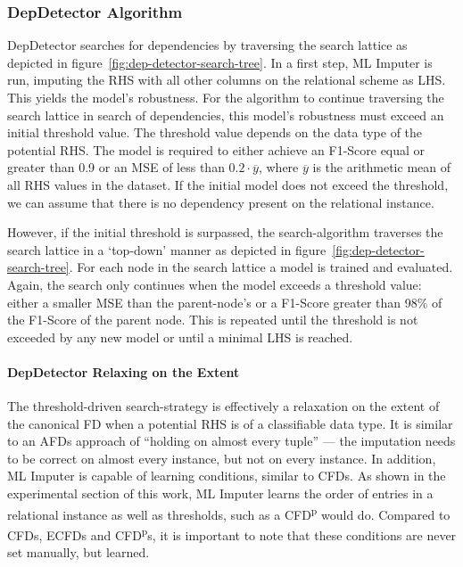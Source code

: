 \subsubsection{DepDetector Algorithm}
DepDetector searches for dependencies by traversing the search lattice as depicted in figure~\ref{fig:dep-detector-search-tree}.
In a first step, ML Imputer is run, imputing the RHS with all other columns on the relational scheme as LHS.
This yields the model's robustness.
For the algorithm to continue traversing the search lattice in search of dependencies, this model's robustness must exceed an initial threshold value.
The threshold value depends on the data type of the potential RHS.
The model is required to either achieve an F1-Score equal or greater than 0.9 or an MSE of less than \( 0.2 \cdot \overline{y} \), where \( \overline{y} \) is the arithmetic mean of all RHS values in the dataset.
If the initial model does not exceed the threshold, we can assume that there is no dependency present on the relational instance.

However, if the initial threshold is surpassed, the search-algorithm traverses the search lattice in a `top-down' manner as depicted in figure~\ref{fig:dep-detector-search-tree}.
For each node in the search lattice a model is trained and evaluated.
Again, the search only continues when the model exceeds a threshold value: either a smaller MSE than the parent-node's or a F1-Score greater than 98\% of the F1-Score of the parent node.
This is repeated until the threshold is not exceeded by any new model or until a minimal LHS is reached.

\paragraph{DepDetector Relaxing on the Extent}The threshold-driven search-strategy is effectively a relaxation on the extent of the canonical FD when a potential RHS is of a classifiable data type.
It is similar to an AFDs approach of ``holding on almost every tuple'' --- the imputation needs to be correct on almost every instance, but not on every instance.
In addition, ML Imputer is capable of learning conditions, similar to CFDs.
As shown in the experimental section of this work, ML Imputer learns the order of entries in a relational instance as well as thresholds, such as a CFD\textsuperscript{p} would do.
Compared to CFDs, ECFDs and CFD\textsuperscript{p}s, it is important to note that these conditions are never set manually, but learned.

